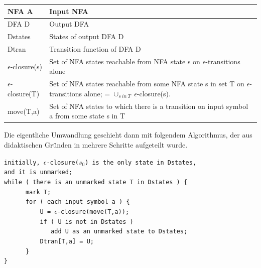 \noindent
\begin{tabular}{|p{2.2cm}|p{9.0cm}|}
  \hline
  NFA A                 & Input NFA \\
  \hline
  DFA D                 & Output DFA \\
  \hline
  Dstates               & States of output DFA D \\
  \hline
  Dtran                 & Transition function of DFA D \\
  \hline
  $\epsilon$-closure(s) & Set of NFA states reachable from NFA state s
                          on $\epsilon$-transitions alone \\
  \hline
  $\epsilon$-closure(T) & Set of NFA states reachable from some NFA state s
                          in set T on $\epsilon$-transitions alone; =
                          $\cup_{s\ in\ T}\ \epsilon$-closure(s). \\
  \hline
  move(T,a)             & Set of NFA states to which there is a transition
                          on input symbol a from some state s in T \\
  \hline
\end{tabular}
\vspace{10pt}

Die eigentliche Umwandlung geschieht dann mit folgendem Algorithmus, der aus
didaktischen Gründen in mehrere Schritte aufgeteilt wurde.\vspace{10pt}

\noindent
\verb|initially, |$\epsilon$\verb|-closure(|$s_0$\verb|) is the only state in Dstates,|\\
\verb|and it is unmarked;|\\
\verb|while ( there is an unmarked state T in Dstates ) {|\\
\verb|      mark T;|\\
\verb|      for ( each input symbol a ) {|\\
\verb|          U = |$\epsilon$\verb|-closure(move(T,a));|\\
\verb|          if ( U is not in Dstates )|\\
\verb|             add U as an unmarked state to Dstates;|\\
\verb|          Dtran[T,a] = U;|\\
\verb|      }|\\
\verb|}|
\vspace{10pt}
